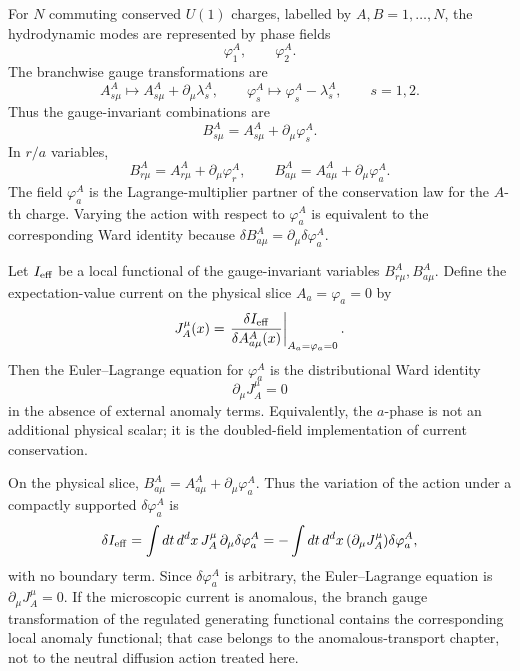 For \(N\) commuting conserved \(U(1)\) charges, labelled by
\(A,B=1,\ldots,N\), the hydrodynamic modes are represented by phase fields
\[
  \varphi^A_1,\qquad \varphi^A_2 .
\]
The branchwise gauge transformations are
\[
  A^A_{s\mu}\mapsto A^A_{s\mu}+\partial_\mu\lambda^A_s,
  \qquad
  \varphi^A_s\mapsto\varphi^A_s-\lambda^A_s,
  \qquad s=1,2.
\]
Thus the gauge-invariant combinations are
\begin{equation}
  B^A_{s\mu}=A^A_{s\mu}+\partial_\mu\varphi^A_s .
  \label{eq:sk-hydro-branch-b-fields}
\end{equation}
In \(r/a\) variables,
\begin{equation}
  B^A_{r\mu}=A^A_{r\mu}+\partial_\mu\varphi^A_r,
  \qquad
  B^A_{a\mu}=A^A_{a\mu}+\partial_\mu\varphi^A_a .
  \label{eq:sk-hydro-ra-b-fields}
\end{equation}
The field \(\varphi^A_a\) is the Lagrange-multiplier partner of the
conservation law for the \(A\)-th charge.  Varying the action with respect
to \(\varphi^A_a\) is equivalent to the corresponding Ward identity because
\(\delta B^A_{a\mu}=\partial_\mu\delta\varphi^A_a\).

\begin{remark}
\label{rem:sk-hydro-gauge-invariance-ward-identity}
Let \(I_{\rm eff}\) be a local functional of the gauge-invariant variables
\(B^A_{r\mu},B^A_{a\mu}\).  Define the expectation-value current on the
physical slice \(A_a=\varphi_a=0\) by
\begin{equation}
  J_A^\mu(x)
  =
  \left.
  \frac{\delta I_{\rm eff}}{\delta A^A_{a\mu}(x)}
  \right|_{A_a=\varphi_a=0}.
  \label{eq:sk-hydro-current-functional-derivative}
\end{equation}
Then the Euler--Lagrange equation for \(\varphi^A_a\) is the distributional
Ward identity
\begin{equation}
  \partial_\mu J_A^\mu=0
  \label{eq:sk-hydro-current-ward-identity}
\end{equation}
in the absence of external anomaly terms.  Equivalently, the \(a\)-phase is
not an additional physical scalar; it is the doubled-field implementation of
current conservation.

On the physical slice, \(B_{a\mu}^A=A_{a\mu}^A+\partial_\mu\varphi_a^A\).
Thus the variation of the action under a compactly supported
\(\delta\varphi_a^A\) is
\begin{equation}
  \delta I_{\rm eff}
  =
  \int dt\,d^dx\,
  J_A^\mu\,\partial_\mu\delta\varphi_a^A
  =
  -\int dt\,d^dx\,
  (\partial_\mu J_A^\mu)\delta\varphi_a^A ,
  \label{eq:sk-hydro-ward-variation-proof}
\end{equation}
with no boundary term.  Since \(\delta\varphi_a^A\) is arbitrary, the
Euler--Lagrange equation is \(\partial_\mu J_A^\mu=0\).  If the microscopic
current is anomalous, the branch gauge transformation of the regulated
generating functional contains the corresponding local anomaly functional;
that case belongs to the anomalous-transport chapter, not to the neutral
diffusion action treated here.
\end{remark}

